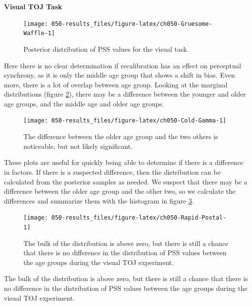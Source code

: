 \documentclass[11pt, oneside, openany]{scrbook}
\begin{document}
\textbf{Visual TOJ Task}

\begin{figure}

{\centering \texttt{[image: 050-results\_files/figure-latex/ch050-Gruesome-Waffle-1]} 

}

\caption{Posterior distribution of PSS values for the visual task.}\label{fig:ch050-Gruesome-Waffle}
\end{figure}

Here there is no clear determination if recalibration has an effect on perceptual synchrony, as it is only the middle age group that shows a shift in bias. Even more, there is a lot of overlap between age group. Looking at the marginal distributions (figure \ref{fig:ch050-Cold-Gamma}), there may be a difference between the younger and older age groups, and the middle age and older age groups.

\begin{figure}

{\centering \texttt{[image: 050-results\_files/figure-latex/ch050-Cold-Gamma-1]} 

}

\caption{The difference between the older age group and the two others is noticeable, but not likely significant.}\label{fig:ch050-Cold-Gamma}
\end{figure}

These plots are useful for quickly being able to determine if there is a difference in factors. If there is a suspected difference, then the distribution can be calculated from the posterior samples as needed. We suspect that there may be a difference between the older age group and the other two, so we calculate the differences and summarize them with the histogram in figure \ref{fig:ch050-Rapid-Postal}.

\begin{figure}

{\centering \texttt{[image: 050-results\_files/figure-latex/ch050-Rapid-Postal-1]} 

}

\caption{The bulk of the distribution is above zero, but there is still a chance that there is no difference in the distribution of PSS values between the age groups during the visual TOJ experiment.}\label{fig:ch050-Rapid-Postal}
\end{figure}

The bulk of the distribution is above zero, but there is still a chance that there is no difference in the distribution of PSS values between the age groups during the visual TOJ experiment.
\end{document}
